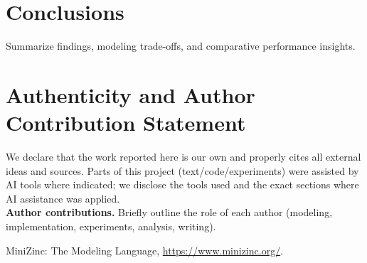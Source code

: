 \documentclass{article}
\begin{document}
\section{Conclusions}
Summarize findings, modeling trade-offs, and comparative performance insights.

\section*{Authenticity and Author Contribution Statement}
We declare that the work reported here is our own and properly cites all external ideas and sources.
Parts of this project (text/code/experiments) were assisted by AI tools where indicated; we disclose the tools used and the exact sections where AI assistance was applied.
\\[0.5em]
\textbf{Author contributions.} Briefly outline the role of each author (modeling, implementation, experiments, analysis, writing).

\begin{thebibliography}{9}

MiniZinc: The Modeling Language,
\url{https://www.minizinc.org/}.


\end{thebibliography}
\end{document}
